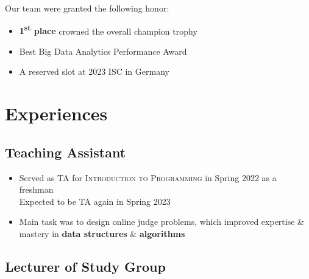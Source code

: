 \documentclass[12pt, a4paper]{article}
\begin{document}
Our team were granted the following honor:

\begin{itemize}
\item \textbf{1\textsuperscript{st} place} crowned the overall champion trophy
\item Best Big Data Analytics Performance Award
\item A reserved slot at 2023 ISC in Germany
\end{itemize}

\section{Experiences}

\subsection{Teaching Assistant}

%

\begin{itemize}
\item Served as TA for \textsc{Introduction to Programming \MakeUppercase{}} in Spring 2022 as a freshman\\
Expected to be TA again in Spring 2023
\item Main task was to design online judge problems, which improved expertise \& mastery in \textbf{data structures} \& \textbf{algorithms}
\end{itemize}

\subsection{Lecturer of Study Group}

%
\end{document}
